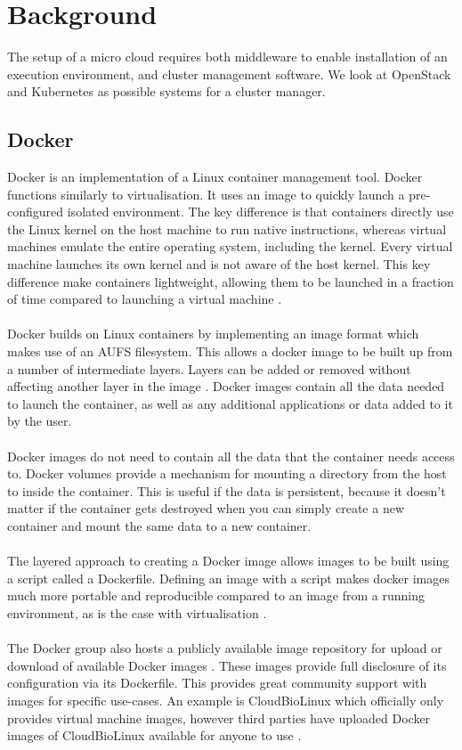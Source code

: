 \documentclass{sig-alternate-05-2015}
\begin{document}
\section{Background}
The setup of a micro cloud requires both middleware to enable installation of an execution environment, and cluster management software. We look at OpenStack and Kubernetes as possible systems for a cluster manager.


\subsection{Docker}
Docker is an implementation of a Linux container management tool. Docker functions similarly to virtualisation. It uses an image to quickly launch a pre-configured isolated environment. The key difference is that containers directly use the Linux kernel on the host machine to run native instructions, whereas virtual machines emulate the entire operating system, including the kernel. Every virtual machine launches its own kernel and is not aware of the host kernel. This key difference make containers lightweight, allowing them to be launched in a fraction of time compared to launching a virtual machine \cite{joy2015performance}. 
\\\\
Docker builds on Linux containers by implementing an image format which makes use of an AUFS filesystem. This allows a docker image to be built up from a number of intermediate layers. Layers can be added or removed without affecting another layer in the image \cite{boettiger2014introduction}. Docker images contain all the data needed to launch the container, as well as any additional applications or data added to it by the user.
\\\\
Docker images do not need to contain all the data that the container needs access to. Docker volumes provide a mechanism for mounting a directory from the host to inside the container. This is useful if the data is persistent, because it doesn't matter if the container gets destroyed when you can simply create a new container and mount the same data to a new container. 
\\\\
The layered approach to creating a Docker image allows images to be built using a script called a Dockerfile. Defining an image with a script makes docker images much more portable and reproducible compared to an image from a running environment, as is the case with virtualisation \cite{boettiger2014introduction}.
\\\\
The Docker group also hosts a publicly available image repository for upload or download of available Docker images \cite{dockerhub}. These images provide full disclosure of its configuration via its Dockerfile. This provides great community support with images for specific use-cases. An example is CloudBioLinux which officially only provides virtual machine images, however third parties have uploaded Docker images of CloudBioLinux available for anyone to use \cite{dockerbiolinux}.
\end{document}
